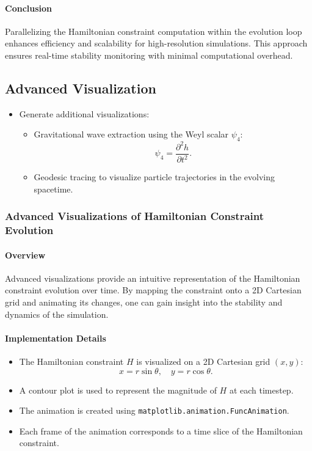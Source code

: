 \documentclass[12pt]{article}
\begin{document}
\paragraph{Conclusion}
Parallelizing the Hamiltonian constraint computation within the evolution loop enhances efficiency and scalability for high-resolution simulations. This approach ensures real-time stability monitoring with minimal computational overhead.


\subsection{Advanced Visualization}
\begin{itemize}
    \item Generate additional visualizations:
    \begin{itemize}
        \item Gravitational wave extraction using the Weyl scalar $\psi_4$:
        \[
        \psi_4 = \frac{\partial^2 h}{\partial t^2}.
        \]
        \item Geodesic tracing to visualize particle trajectories in the evolving spacetime.
    \end{itemize}
\end{itemize}

\subsubsection{Advanced Visualizations of Hamiltonian Constraint Evolution}

\paragraph{Overview}
Advanced visualizations provide an intuitive representation of the Hamiltonian constraint evolution over time. By mapping the constraint onto a 2D Cartesian grid and animating its changes, one can gain insight into the stability and dynamics of the simulation.

\paragraph{Implementation Details}
\begin{itemize}
    \item The Hamiltonian constraint $H$ is visualized on a 2D Cartesian grid $(x, y)$:
    \[
    x = r \sin\theta, \quad y = r \cos\theta.
    \]
    \item A contour plot is used to represent the magnitude of $H$ at each timestep.
    \item The animation is created using \texttt{matplotlib.animation.FuncAnimation}.
    \item Each frame of the animation corresponds to a time slice of the Hamiltonian constraint.
\end{itemize}
\end{document}
